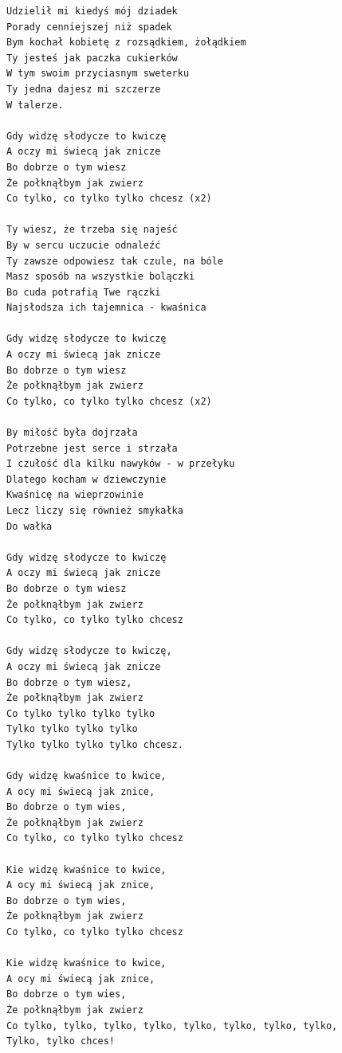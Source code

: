 \documentclass[12pt]{article}
\begin{document}
\begin{verbatim}
Udzielił mi kiedyś mój dziadek
Porady cenniejszej niż spadek
Bym kochał kobietę z rozsądkiem, żołądkiem
Ty jesteś jak paczka cukierków
W tym swoim przyciasnym sweterku
Ty jedna dajesz mi szczerze
W talerze.

Gdy widzę słodycze to kwiczę
A oczy mi świecą jak znicze
Bo dobrze o tym wiesz
Że połknąłbym jak zwierz
Co tylko, co tylko tylko chcesz (x2)

Ty wiesz, że trzeba się najeść
By w sercu uczucie odnaleźć
Ty zawsze odpowiesz tak czule, na bóle
Masz sposób na wszystkie bolączki
Bo cuda potrafią Twe rączki
Najsłodsza ich tajemnica - kwaśnica

Gdy widzę słodycze to kwiczę
A oczy mi świecą jak znicze
Bo dobrze o tym wiesz
Że połknąłbym jak zwierz
Co tylko, co tylko tylko chcesz (x2)

By miłość była dojrzała
Potrzebne jest serce i strzała
I czułość dla kilku nawyków - w przełyku
Dlatego kocham w dziewczynie
Kwaśnicę na wieprzowinie
Lecz liczy się również smykałka
Do wałka

Gdy widzę słodycze to kwiczę
A oczy mi świecą jak znicze
Bo dobrze o tym wiesz
Że połknąłbym jak zwierz
Co tylko, co tylko tylko chcesz

Gdy widzę słodycze to kwiczę,
A oczy mi świecą jak znicze
Bo dobrze o tym wiesz,
Że połknąłbym jak zwierz
Co tylko tylko tylko tylko
Tylko tylko tylko tylko
Tylko tylko tylko tylko chcesz.

Gdy widzę kwaśnice to kwice,
A ocy mi świecą jak znice,
Bo dobrze o tym wies,
Że połknąłbym jak zwierz
Co tylko, co tylko tylko chcesz

Kie widzę kwaśnice to kwice,
A ocy mi świecą jak znice,
Bo dobrze o tym wies,
Że połknąłbym jak zwierz
Co tylko, co tylko tylko chcesz

Kie widzę kwaśnice to kwice,
A ocy mi świecą jak znice,
Bo dobrze o tym wies,
Że połknąłbym jak zwierz
Co tylko, tylko, tylko, tylko, tylko, tylko, tylko, tylko,
Tylko, tylko chces!
\end{verbatim}
\clearpage
\end{document}
